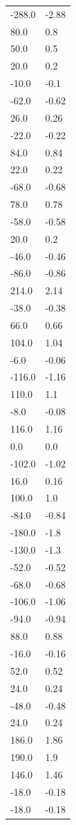 \begin{longtable}{ll}
-288.0 & -2.88 \\
80.0 & 0.8 \\
50.0 & 0.5 \\
20.0 & 0.2 \\
-10.0 & -0.1 \\
-62.0 & -0.62 \\
26.0 & 0.26 \\
-22.0 & -0.22 \\
84.0 & 0.84 \\
22.0 & 0.22 \\
-68.0 & -0.68 \\
78.0 & 0.78 \\
-58.0 & -0.58 \\
20.0 & 0.2 \\
-46.0 & -0.46 \\
-86.0 & -0.86 \\
214.0 & 2.14 \\
-38.0 & -0.38 \\
66.0 & 0.66 \\
104.0 & 1.04 \\
-6.0 & -0.06 \\
-116.0 & -1.16 \\
110.0 & 1.1 \\
-8.0 & -0.08 \\
116.0 & 1.16 \\
0.0 & 0.0 \\
-102.0 & -1.02 \\
16.0 & 0.16 \\
100.0 & 1.0 \\
-84.0 & -0.84 \\
-180.0 & -1.8 \\
-130.0 & -1.3 \\
-52.0 & -0.52 \\
-68.0 & -0.68 \\
-106.0 & -1.06 \\
-94.0 & -0.94 \\
88.0 & 0.88 \\
-16.0 & -0.16 \\
52.0 & 0.52 \\
24.0 & 0.24 \\
-48.0 & -0.48 \\
24.0 & 0.24 \\
186.0 & 1.86 \\
190.0 & 1.9 \\
146.0 & 1.46 \\
-18.0 & -0.18 \\
-18.0 & -0.18 \\

\end{longtable}
